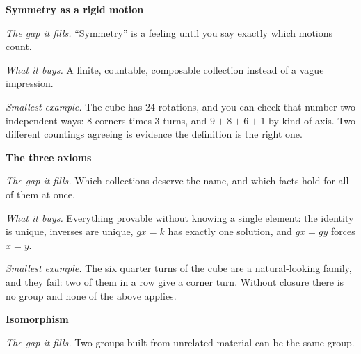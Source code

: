 \documentclass[10pt]{article}
\begin{document}
{\begin{minipage}[t]{744pt}
{
}\par\vspace{5pt}
\begin{minipage}[t]{238pt}\vspace{0pt}
{\sffamily\bfseries\color{big} Symmetry as a rigid motion}\par\vspace{1pt}
\emph{The gap it fills.} ``Symmetry'' is a feeling until you say exactly which motions count.\par\vspace{1pt}
\emph{What it buys.} A finite, countable, composable collection instead of a vague impression.\par\vspace{1pt}
\emph{Smallest example.} The cube has $24$ rotations, and you can check that number two independent ways: $8$ corners times $3$ turns, and $9+8+6+1$ by kind of axis. Two different countings agreeing is evidence the definition is the right one.\par\vspace{5pt}
{\sffamily\bfseries\color{big} The three axioms}\par\vspace{1pt}
\emph{The gap it fills.} Which collections deserve the name, and which facts hold for all of them at once.\par\vspace{1pt}
\emph{What it buys.} Everything provable without knowing a single element: the identity is unique, inverses are unique, $gx=k$ has exactly one solution, and $gx=gy$ forces $x=y$.\par\vspace{1pt}
\emph{Smallest example.} The six quarter turns of the cube are a natural-looking family, and they fail: two of them in a row give a corner turn. Without closure there is no group and none of the above applies.\par\vspace{5pt}
{\sffamily\bfseries\color{big} Isomorphism}\par\vspace{1pt}
\emph{The gap it fills.} Two groups built from unrelated material can be the same group.\par\vspace{1pt}

\end{minipage}
\end{minipage}}
\end{document}
